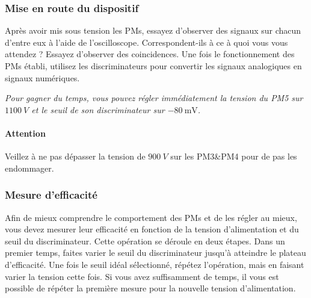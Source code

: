 \begin{center}
\end{center}

\subsubsection{Mise en route du dispositif}

Après avoir mis sous tension les PMs, essayez d'observer des signaux sur chacun d'entre eux à l'aide de l'oscilloscope.
Correspondent-ils à ce à quoi vous vous attendez ?
Essayez d'observer des coincidences.
Une fois le fonctionnement des PMs établi, utilisez les discriminateurs pour convertir les signaux analogiques en signaux numériques.

\textit{Pour gagner du temps, vous pouvez régler immédiatement la tension du PM5 sur \(\SI{1100}{V}\) et le seuil de son discriminateur sur \(\SI{-80}{\mV}\).}

\paragraph{Attention} Veillez à ne pas dépasser la tension de \(\SI{900}{V}\) sur les PM3\&PM4 pour de pas les endommager.

\subsubsection{Mesure d'efficacité}
Afin de mieux comprendre le comportement des PMs et de les régler au mieux, vous devez mesurer leur efficacité en fonction de la tension d'alimentation et du seuil du discriminateur.
Cette opération se déroule en deux étapes.
Dans un premier temps, faites varier le seuil du discriminateur jusqu'à atteindre le plateau d'efficacité.
Une fois le seuil idéal sélectionné, répétez l'opération, mais en faisant varier la tension cette fois.
Si vous avez suffisamment de temps, il vous est possible de répéter la première mesure pour la nouvelle tension d'alimentation.

